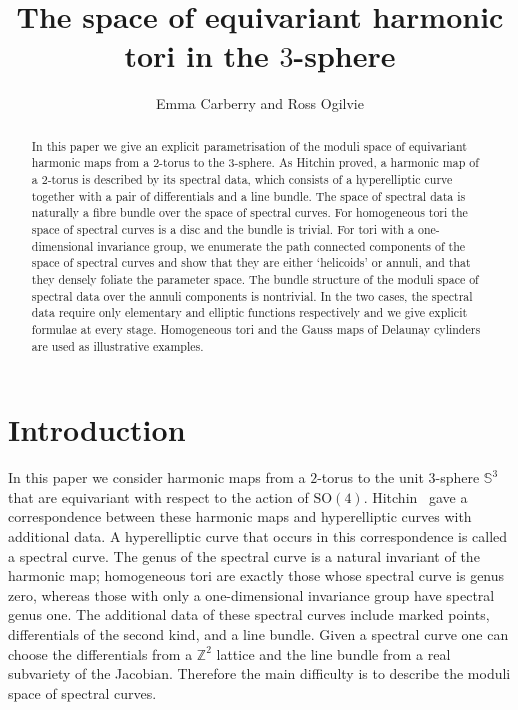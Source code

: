 \documentclass{article}
\numberwithin{equation}{section}
\numberwithin{figure}{section}
\renewcommand{\S}{\mathbb{S}}
\newcommand{\SO}{\mathrm{SO}}
\begin{document}
\title{The space of equivariant harmonic tori in the $3$-sphere}
\author{Emma Carberry and Ross Ogilvie}
\date{}
\maketitle

\begin{abstract}
In this paper we give an explicit parametrisation of the moduli space of equivariant harmonic maps from a $2$-torus to the $3$-sphere. 
As Hitchin proved, a harmonic map of a $2$-torus is described by its spectral data, which consists of a hyperelliptic curve together with a pair of differentials and a line bundle. The space of spectral data is naturally a fibre bundle over the space of spectral curves.
For homogeneous tori the space of spectral curves is a disc and the bundle is trivial.
For tori with a one-dimensional invariance group, we enumerate the path connected components of the space of spectral curves and show that they are either `helicoids' or annuli, and that they densely foliate the parameter space. The bundle structure of the moduli space of spectral data over the annuli components is nontrivial.
In the two cases, the spectral data require only elementary and elliptic functions respectively and we give explicit formulae at every stage.
Homogeneous tori and the Gauss maps of Delaunay cylinders are used as illustrative examples.
\end{abstract}

\section{Introduction}\label{sec:Introduction}

In this paper we consider harmonic maps from a $2$-torus to the unit $3$-sphere $\S^3$ that are equivariant with respect to the action of $\SO(4)$.
Hitchin~\cite{Hitchin1990} gave a correspondence between these harmonic maps and hyperelliptic curves with additional data. A hyperelliptic curve that occurs in this correspondence is called a spectral curve. 
The genus of the spectral curve is a natural invariant of the harmonic map; homogeneous tori are exactly those whose spectral curve is genus zero, whereas those with only a one-dimensional invariance group have spectral genus one.
The additional data of these spectral curves include marked points, differentials of the second kind, and a line bundle. 
Given a spectral curve one can choose the differentials from a $\mathbb{Z}^2$ lattice and the line bundle from a real subvariety of the Jacobian. Therefore the main difficulty is to describe the moduli space of spectral curves.
\end{document}
